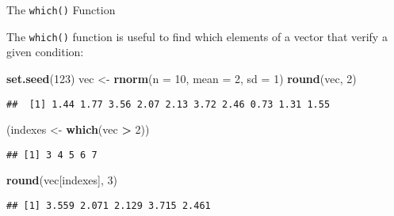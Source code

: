 \documentclass[ignorenonframetext,]{beamer}
\newenvironment{Shaded}{\begin{snugshade}}{\end{snugshade}}
\newcommand{\DataTypeTok}[1]{\textcolor[rgb]{0.13,0.29,0.53}{#1}}
\newcommand{\DecValTok}[1]{\textcolor[rgb]{0.00,0.00,0.81}{#1}}
\newcommand{\KeywordTok}[1]{\textcolor[rgb]{0.13,0.29,0.53}{\textbf{#1}}}
\newcommand{\NormalTok}[1]{#1}
\newcommand{\OperatorTok}[1]{\textcolor[rgb]{0.81,0.36,0.00}{\textbf{#1}}}
\newcommand{\StringTok}[1]{\textcolor[rgb]{0.31,0.60,0.02}{#1}}
\begin{document}
\begin{frame}[fragile]{The \texttt{which()} Function}
\protect\hypertarget{the-which-function}{}

The \texttt{which()} function is useful to find which elements of a
vector that verify a given condition:

\begin{Shaded}
\begin{Highlighting}[]
\KeywordTok{set.seed}\NormalTok{(}\DecValTok{123}\NormalTok{)}
\NormalTok{vec <-}\StringTok{ }\KeywordTok{rnorm}\NormalTok{(}\DataTypeTok{n =} \DecValTok{10}\NormalTok{, }\DataTypeTok{mean =} \DecValTok{2}\NormalTok{, }\DataTypeTok{sd =} \DecValTok{1}\NormalTok{)}
\KeywordTok{round}\NormalTok{(vec, }\DecValTok{2}\NormalTok{)}
\end{Highlighting}
\end{Shaded}

\begin{verbatim}
##  [1] 1.44 1.77 3.56 2.07 2.13 3.72 2.46 0.73 1.31 1.55
\end{verbatim}

\begin{Shaded}
\begin{Highlighting}[]
\NormalTok{(indexes <-}\StringTok{ }\KeywordTok{which}\NormalTok{(vec }\OperatorTok{>}\StringTok{  }\DecValTok{2}\NormalTok{))}
\end{Highlighting}
\end{Shaded}

\begin{verbatim}
## [1] 3 4 5 6 7
\end{verbatim}

\begin{Shaded}
\begin{Highlighting}[]
\KeywordTok{round}\NormalTok{(vec[indexes], }\DecValTok{3}\NormalTok{)}
\end{Highlighting}
\end{Shaded}

\begin{verbatim}
## [1] 3.559 2.071 2.129 3.715 2.461
\end{verbatim}

\end{frame}
\end{document}
